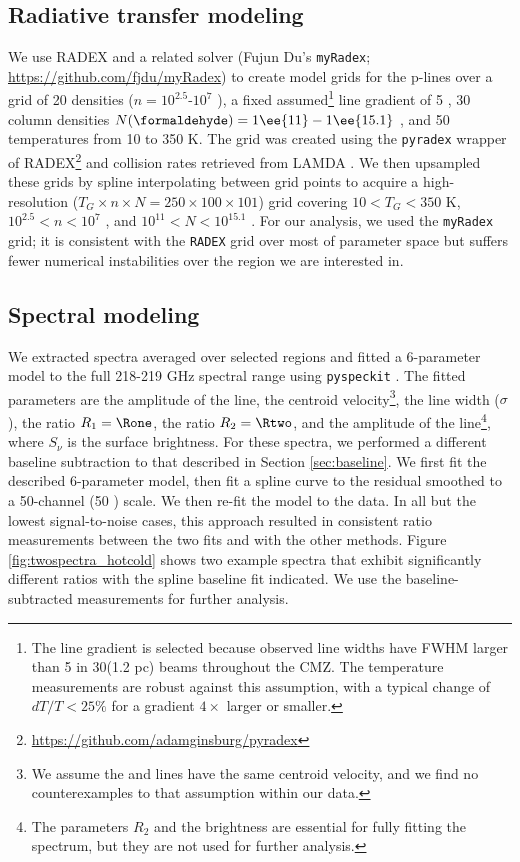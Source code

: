 \subsection{Radiative transfer modeling}
\label{sec:linemodeling}
We use RADEX \citep{van-Der-Tak2007a} and a related solver (Fujun Du's
\texttt{myRadex}; \url{https://github.com/fjdu/myRadex}) to create model grids
for the p-\formaldehyde lines over a grid of 20 densities ($n=10^{2.5}$-$10^{7}$
\percc), a fixed assumed\footnote{The line gradient is selected because
observed line widths have FWHM larger than 5 \kms in 30\arcsec (1.2 pc) beams
throughout the CMZ.  The temperature measurements are
robust against this assumption, with a typical change of $dT/T < 25\%$ for a
gradient $4\times$ larger or smaller.} line gradient of 5
\perkmspc, 30 \formaldehyde column densities $N(\formaldehyde) =
1\ee{11}-1\ee{15.1}$ \persc, and 50
temperatures from 10 to 350 K.  The grid was created using the \texttt{pyradex}
wrapper of RADEX\footnote{\url{https://github.com/adamginsburg/pyradex}} and
collision rates retrieved from LAMDA \citep{Wiesenfeld2013a}.  We then
upsampled these grids by spline interpolating between grid points to acquire a
high-resolution ($T_G\times n \times N = 250\times100\times101$) grid covering
$10<T_G<350$ K, $10^{2.5} < n < 10^7$ \percc, and $10^{11} < N < 10^{15.1}$
\persc\perkmspc.  For our analysis, we used the \texttt{myRadex} grid; it is
consistent with the \texttt{RADEX} grid over most of parameter space but
suffers fewer numerical instabilities over the region we are interested in.

\subsection{Spectral modeling}
\label{sec:spectralmodeling}
We extracted spectra averaged over selected regions and fitted
a 6-parameter model to the full 218-219 GHz spectral range using
\texttt{pyspeckit} \citep{Ginsburg2011c}.  The fitted parameters are the
amplitude of the \formaldehyde \threeohthree line, the centroid
velocity\footnote{We assume the \methanol and \formaldehyde lines have the same
centroid velocity, and we find no counterexamples to that assumption within our
data.}, the line width ($\sigma$), the ratio $R_1 = \Rone$, the ratio $R_2 =
\Rtwo$, and the
amplitude of the \methanol \fourtwotwo line\footnote{The parameters $R_2$ and
the \methanol brightness are essential for fully fitting the spectrum, but they
are not used for further analysis.}, where $S_\nu$ is the surface
brightness.  For these spectra, we performed a different baseline subtraction
to that described in Section
\ref{sec:baseline}.  We first fit the described 6-parameter model, then fit a
spline curve to the residual smoothed to a 50-channel (50 \kms) scale.  We then
re-fit the model to the data.  In all but the lowest signal-to-noise cases,
this approach resulted in consistent ratio measurements between the two fits
and with the other methods.  Figure \ref{fig:twospectra_hotcold} shows two
example spectra that exhibit significantly different ratios with the spline
baseline fit indicated.  We use the baseline-subtracted measurements for
further analysis.

